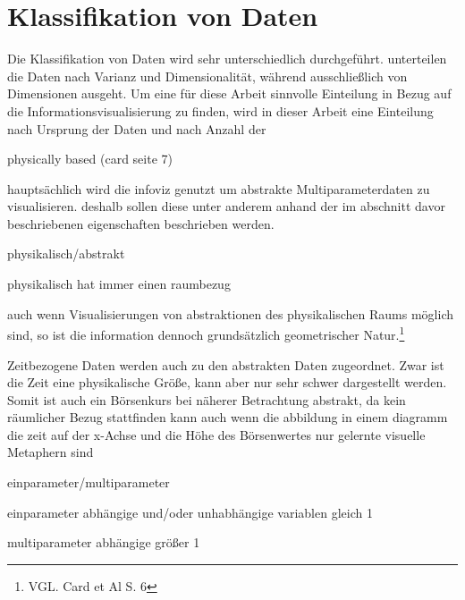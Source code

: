 \documentclass[a4paper, 12pt, DIVcalc, onepage, pdftex, headsepline, footsepline]{scrreprt}
\begin{document}
\section{Klassifikation von Daten}
\label{sec:KlassifikationDaten}

Die Klassifikation von Daten wird sehr unterschiedlich durchgeführt. \citep{Schumann} unterteilen die Daten
nach Varianz und Dimensionalität, während \citep{Preim} ausschließlich von Dimensionen ausgeht.
Um eine für diese Arbeit sinnvolle Einteilung in Bezug auf die Informationsvisualisierung zu finden, wird in dieser
Arbeit eine Einteilung nach Ursprung der Daten und nach Anzahl der 

physically based (card seite 7)

hauptsächlich wird die infoviz genutzt um abstrakte Multiparameterdaten zu visualisieren.
deshalb sollen diese unter anderem anhand der im abschnitt davor beschriebenen eigenschaften beschrieben
werden.

physikalisch/abstrakt

physikalisch hat immer einen raumbezug

auch wenn Visualisierungen von abstraktionen des physikalischen Raums möglich sind, so ist die information
dennoch grundsätzlich geometrischer Natur.\footnote{VGL. Card et Al S. 6}


Zeitbezogene Daten werden auch zu den abstrakten Daten zugeordnet. Zwar ist die Zeit eine physikalische
Größe, kann aber nur sehr schwer dargestellt werden. Somit ist auch ein Börsenkurs bei näherer Betrachtung
abstrakt, da kein räumlicher Bezug stattfinden kann auch wenn die abbildung in einem diagramm die zeit auf der x-Achse und die Höhe des Börsenwertes nur 
gelernte visuelle Metaphern sind

einparameter/multiparameter

einparameter
abhängige und/oder unhabhängige variablen gleich 1

multiparameter
abhängige größer 1
\end{document}
